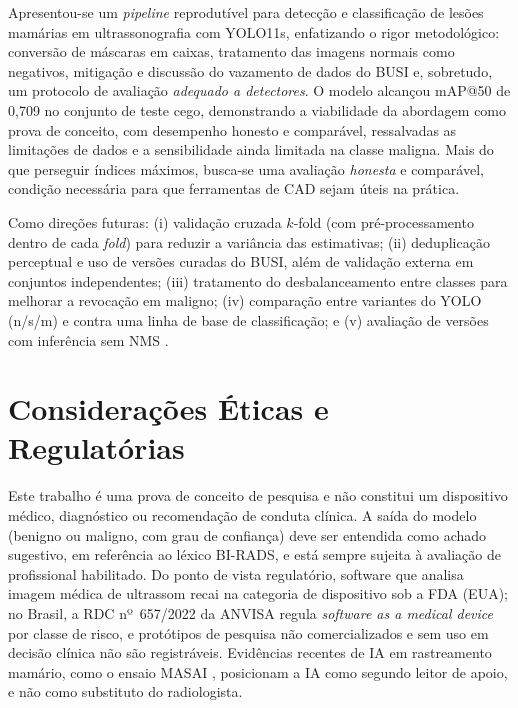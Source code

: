 \documentclass[11pt,a4paper]{article}
\begin{document}
Apresentou-se um \emph{pipeline} reprodutível para detecção e classificação de
lesões mamárias em ultrassonografia com YOLO11s, enfatizando o rigor
metodológico: conversão de máscaras em caixas, tratamento das imagens normais como
negativos, mitigação e discussão do vazamento de dados do BUSI e, sobretudo, um
protocolo de avaliação \emph{adequado a detectores}. O modelo alcançou mAP@50 de
0,709 no conjunto de teste cego, demonstrando a viabilidade da abordagem como
prova de conceito, com desempenho honesto e comparável, ressalvadas as limitações
de dados e a sensibilidade ainda limitada na classe maligna. Mais do que perseguir
índices máximos, busca-se uma avaliação \emph{honesta} e comparável, condição
necessária para que ferramentas de CAD sejam úteis na prática.

Como direções futuras: (i) validação cruzada $k$-fold (com pré-processamento
dentro de cada \textit{fold}) para reduzir a variância das estimativas; (ii)
deduplicação perceptual e uso de versões curadas do BUSI, além de validação
externa em conjuntos independentes; (iii) tratamento do desbalanceamento entre
classes para melhorar a revocação em maligno; (iv) comparação entre variantes do
YOLO (n/s/m) e contra uma linha de base de classificação; e (v) avaliação de
versões com inferência sem NMS \citep{ultralytics2026}.

\section{Considerações Éticas e Regulatórias}\label{sec:etica}

Este trabalho é uma prova de conceito de pesquisa e não constitui um dispositivo
médico, diagnóstico ou recomendação de conduta clínica. A saída do modelo (benigno
ou maligno, com grau de confiança) deve ser entendida como achado sugestivo, em
referência ao léxico BI-RADS, e está sempre sujeita à avaliação de profissional
habilitado. Do ponto de vista regulatório, software que analisa imagem médica de
ultrassom recai na categoria de dispositivo sob a FDA (EUA); no Brasil, a RDC
nº~657/2022 da ANVISA regula \textit{software as a medical device} por classe de
risco, e protótipos de pesquisa não comercializados e sem uso em decisão clínica
não são registráveis. Evidências recentes de IA em rastreamento mamário, como o
ensaio MASAI \citep{lang2023}, posicionam a IA como segundo leitor de apoio, e não
como substituto do radiologista.
\end{document}

